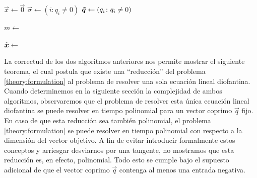 \begin{algorithm}[H]
	\LinesNumbered
	\DontPrintSemicolon
		$\vec{x} \leftarrow \vec{0}$\;
		$\vec{\sigma} \leftarrow \left(i \colon q_i \neq 0\right)$\;
		$\boldsymbol{\tilde{q}} \leftarrow \left( q_i \colon q_i \neq 0 \right)$\;
		\label{alg:def:inf:tilde-q}

		$m \leftarrow$ \; \label{alg:subr:length}
		\quad{}\; \label{alg:subr:swap1}

		\quad{}\; \label{alg:subr:swap3}
		$\boldsymbol{\tilde{x}} \leftarrow$ \quad{}\;
		\; \label{alg:subr:swap2}
		\;

	\caption{\texttt{Dioph}}
	\label{algo:inf:ext}
\end{algorithm}
\newpage

La correctud de los dos algoritmos anteriores nos permite mostrar el siguiente teorema, el cual
postula que existe una ``reducción'' del problema \eqref{theory:formulation} al problema de resolver
una sola ecuación lineal diofantina. Cuando determinemos en la siguiente sección la complejidad de
ambos algoritmos, observaremos que el problema de resolver esta única ecuación lineal diofantina se
puede resolver en tiempo polinomial para un vector coprimo $\vec{q}$ fijo. En caso de que esta
reducción sea también polinomial, el problema \eqref{theory:formulation} se puede resolver
en tiempo polinomial con respecto a la dimensión del vector objetivo. A fin de evitar introducir
formalmente estos conceptos y arriesgar desviarnos por una tangente, no mostramos que esta reducción es,
en efecto, polinomial. Todo esto se cumple bajo el supuesto adicional de que el vector coprimo
$\vec{q}$ contenga al menos una entrada negativa.

